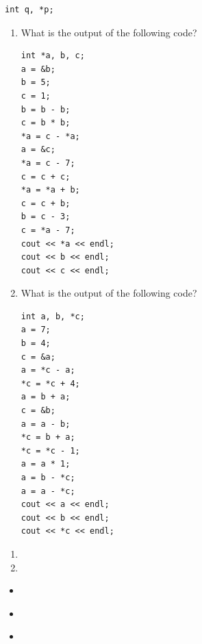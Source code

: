 \noindent\begin{minipage}{\linewidth}\begin{lstlisting}
int q, *p;
\end{lstlisting}\end{minipage}


\begin{enumerate}
	\item What is the output of the following code?

\noindent\begin{minipage}{\linewidth}\begin{lstlisting}
int *a, b, c;
a = &b;
b = 5;
c = 1;
b = b - b;
c = b * b;
*a = c - *a;
a = &c;
*a = c - 7;
c = c + c;
*a = *a + b;
c = c + b;
b = c - 3;
c = *a - 7;
cout << *a << endl;
cout << b << endl;
cout << c << endl;
\end{lstlisting}\end{minipage}
	\item What is the output of the following code?

\noindent\begin{minipage}{\linewidth}\begin{lstlisting}
int a, b, *c;
a = 7;
b = 4;
c = &a;
a = *c - a;
*c = *c + 4;
a = b + a;
c = &b;
a = a - b;
*c = b + a;
*c = *c - 1;
a = a * 1;
a = b - *c;
a = a - *c;
cout << a << endl;
cout << b << endl;
cout << *c << endl;
\end{lstlisting}\end{minipage}
\end{enumerate}


\begin{enumerate}
	\item {}



	\item {}


\end{enumerate}


\begin{itemize}
\item ~
\item ~
\item ~
\end{itemize}	
